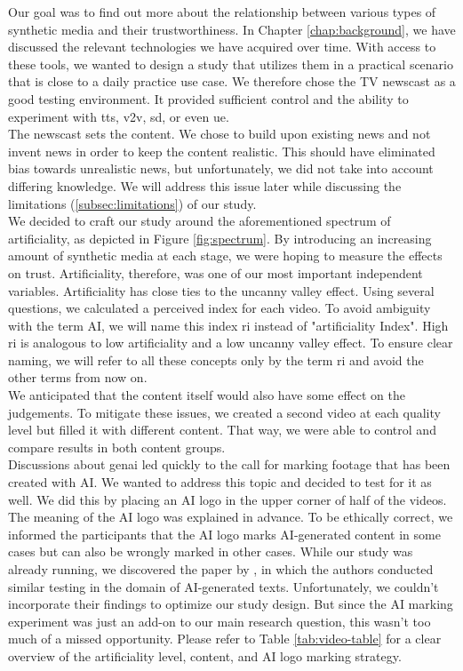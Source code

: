 \documentclass[
  a4paper,  %
  twoside,  %
  bibliography=totoc,
  headsepline,
  cleardoublepage=empty,
  parskip=half,
  draft=false
]{scrbook}
\begin{document}
Our goal was to find out more about the relationship between various types of synthetic media and their trustworthiness. In Chapter \ref{chap:background}, we have discussed the relevant technologies we have acquired over time. With access to these tools, we wanted to design a study that utilizes them in a practical scenario that is close to a daily practice use case. We therefore chose the TV newscast as a good testing environment. It provided sufficient control and the ability to experiment with \gls{tts}, \gls{v2v}, \gls{sd}, or even \gls{ue}. \\
The newscast sets the content. We chose to build upon existing news and not invent news in order to keep the content realistic. This should have eliminated bias towards unrealistic news, but unfortunately, we did not take into account differing knowledge. We will address this issue later while discussing the limitations (\ref{subsec:limitations}) of our study. \\
We decided to craft our study around the aforementioned spectrum of artificiality, as depicted in Figure \ref{fig:spectrum}. By introducing an increasing amount of synthetic media at each stage, we were hoping to measure the effects on trust. Artificiality, therefore, was one of our most important independent variables. Artificiality has close ties to the uncanny valley effect. Using several questions, we calculated a perceived index for each video. To avoid ambiguity with the term AI, we will name this index \gls{ri} instead of "artificiality Index". High \gls{ri} is analogous to low artificiality and a low uncanny valley effect. To ensure clear naming, we will refer to all these concepts only by the term \gls{ri} and avoid the other terms from now on. \\
We anticipated that the content itself would also have some effect on the judgements. To mitigate these issues, we created a second video at each quality level but filled it with different content. That way, we were able to control and compare results in both content groups. \\
Discussions about \gls{genai} led quickly to the call for marking footage that has been created with AI. We wanted to address this topic and decided to test for it as well. We did this by placing an AI logo in the upper corner of half of the videos. The meaning of the AI logo was explained in advance. To be ethically correct, we informed the participants that the AI logo marks AI-generated content in some cases but can also be wrongly marked in other cases. While our study was already running, we discovered the paper by \citeauthor{toffTheyCouldJust2023}, in which the authors conducted similar testing in the domain of AI-generated texts. Unfortunately, we couldn’t incorporate their findings to optimize our study design. But since the AI marking experiment was just an add-on to our main research question, this wasn’t too much of a missed opportunity. Please refer to Table \ref{tab:video-table} for a clear overview of the artificiality level, content, and AI logo marking strategy. 
\end{document}
